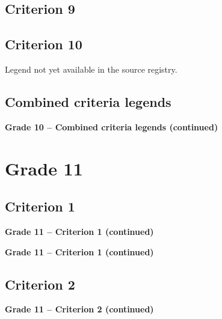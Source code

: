 \subsection{Criterion 9}\label{preview:g10c9}
\PreviewBackToContents



\subsection{Criterion 10}\label{preview:g10c10}
Legend not yet available in the source registry.
\PreviewBackToContents


\clearpage
\subsection{Combined criteria legends}
\PreviewBackToContents


\noindent\textbf{Grade 10 -- Combined criteria legends (continued)}
\PreviewBackToContents


\clearpage
\section{Grade 11}
\subsection{Criterion 1}\label{preview:g11c1}


\noindent\textbf{Grade 11 -- Criterion 1 (continued)}


\noindent\textbf{Grade 11 -- Criterion 1 (continued)}
\PreviewBackToContents



\subsection{Criterion 2}\label{preview:g11c2}


\noindent\textbf{Grade 11 -- Criterion 2 (continued)}
\PreviewBackToContents



